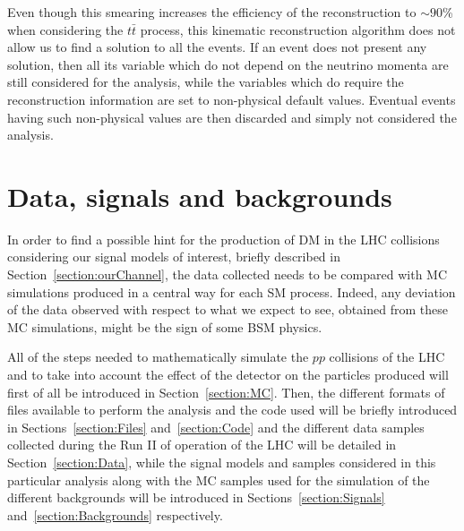 \documentclass[a4paper, 10pt, openright]{report}
\begin{document}
Even though this smearing increases the efficiency of the reconstruction to $\sim 90$\% when considering the $t \bar t$ process, this kinematic reconstruction algorithm does not allow us to find a solution to all the events. If an event does not present any solution, then all its variable which do not depend on the neutrino momenta are still considered for the analysis, while the variables which do require the reconstruction information are set to non-physical default values. Eventual events having such non-physical values are then discarded and simply not considered the analysis.

























\chapter{Data, signals and backgrounds} \label{chapter:Samples}

In order to find a possible hint for the production of \ac{DM} in the \ac{LHC} collisions considering our signal models of interest, briefly described in Section~\ref{section:ourChannel}, the data collected needs to be compared with \acf{MC} simulations produced in a central way for each \ac{SM} process. Indeed, any deviation of the data observed with respect to what we expect to see, obtained from these \ac{MC} simulations, might be the sign of some \ac{BSM} physics. 

All of the steps needed to mathematically simulate the $pp$ collisions of the \ac{LHC} and to take into account the effect of the detector on the particles produced will first of all be introduced in Section~\ref{section:MC}. Then, the different formats of files available to perform the analysis and the code used will be briefly introduced in Sections~\ref{section:Files} and~\ref{section:Code} and the different data samples collected during the Run II of operation of the \ac{LHC} will be detailed in Section~\ref{section:Data}, while the signal models and samples considered in this particular analysis along with the \ac{MC} samples used for the simulation of the different backgrounds will be introduced in Sections~\ref{section:Signals} and~\ref{section:Backgrounds} respectively.
\end{document}
